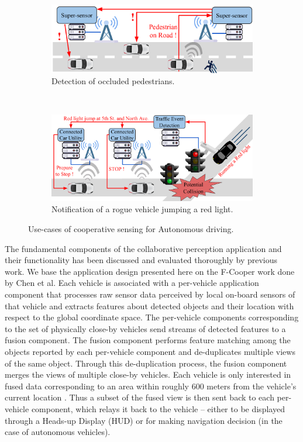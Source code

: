 \begin{figure}[t!]
    \centering
    \begin{subfigure}[t]{0.45\textwidth}
        \centering
        \includegraphics[width=\textwidth]{figures/apps/pedestrian}
        \caption{Detection of occluded pedestrians.}
        \label{fig:pedestrian}
    \end{subfigure}%
    ~ 
    \begin{subfigure}[t]{0.45\textwidth}
        \centering
        \includegraphics[width=\textwidth]{figures/apps/redlight}
        \caption{Notification of a rogue vehicle jumping a red light.}
        \label{fig:redlight}
    \end{subfigure}
    \caption{Use-cases of cooperative sensing for Autonomous driving.}
\end{figure}
\par The fundamental components of the collaborative perception application and their functionality has been discussed and evaluated thoroughly by previous work\cite{fcooper, fusioneye, avr}. We base the application design presented here on the F-Cooper \cite{fcooper} work done by Chen et al. Each vehicle is associated with a per-vehicle application component that processes raw sensor data perceived by local on-board sensors of that vehicle and extracts features about detected objects and their location with respect to the global coordinate space.  The per-vehicle components corresponding to the set of physically close-by vehicles send streams of detected features to a fusion component. The fusion component performs feature matching among the objects reported by each per-vehicle component and de-duplicates  multiple views of the same object. Through this de-duplication process, the fusion component merges the views of multiple close-by vehicles.  Each vehicle is only interested in fused data corresponding to an area within roughly 600 meters from the vehicle's current location \cite{talkycars}. Thus a subset of the fused view is then sent back to each per-vehicle component, which relays it back to the vehicle -- either to be displayed through a Heads-up Display (HUD) or for making navigation decision (in the case of autonomous vehicles).

